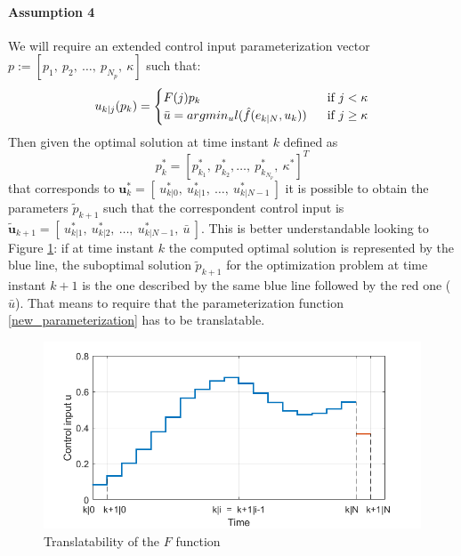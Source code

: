 \paragraph{Assumption 4} We will require an extended control input parameterization vector $p:=[p_1,\ p_2,\ \dots,\ p_{N_p},\ \kappa]$ such that: 
\begin{equation}
\begin{split}\label{new_parameterization}
    u_{k|j}(p_k)=
        \begin{cases}
            F(j){p_k}\ \ \ \ \   &\textnormal{if } j<\kappa \\
            \bar{u}=argmin_u l(\hat{f}(e_{k|N},u_k))\ \ &\textnormal{if } j\ge \kappa
        \end{cases}
    \end{split}
\end{equation} 
Then given the optimal solution at time instant $k$ defined as $$p_k^*=\left[ p_{k_1}^*,\ p_{k_2}^*,  \dots,\ p_{k_{N_p}}^*,\ \kappa^* \right]^T$$ that corresponds to $  \textbf{u}_k^*=[\ u_{k|0}^*,\ u_{k|1}^*,\  \dots,\  u_{k|{N-1}}^*\ ]$ it is possible to obtain the parameters $\tilde{p}_{k+1}$ such that the correspondent control input is $  \tilde{\textbf{u}}_{k+1}=[\ u_{k|1}^*,\ u_{k|2}^*,\  \dots,\  u_{k|{N-1}}^*,\ \bar{u} \ ]$. This is better understandable looking to Figure \ref{param_translatability}: if at time instant $k$ the computed optimal solution is represented by the blue line, the suboptimal solution $\tilde{p}_{k+1}$ for the optimization problem at time instant $k+1$ is the one described by the same blue line followed by the red one ($\bar{u}$).
That means to require that the parameterization function \ref{new_parameterization} has to be translatable.
\begin{figure}[h!]
	\centering
	\includegraphics[scale=0.6]{IMMAGINI/trans_u.png}
	\caption{Translatability of the $F$ function}
	\label{param_translatability}
\end{figure}

